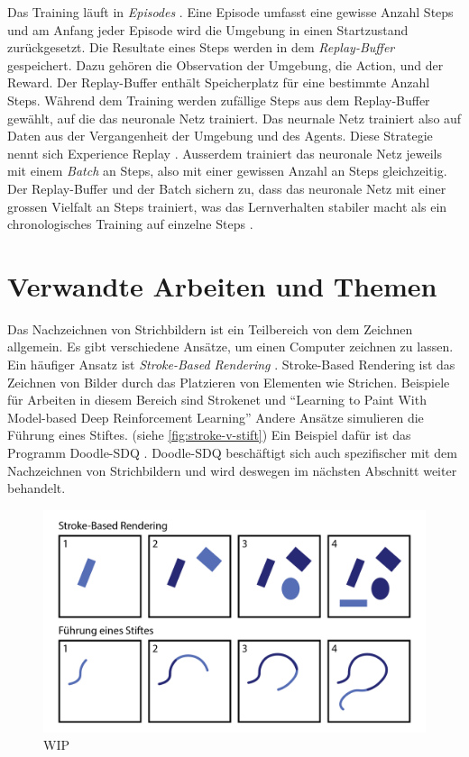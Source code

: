 Das Training läuft in \emph{Episodes} \cite[S. 14]{sutton_reinforcement_2014}.
Eine Episode umfasst eine gewisse Anzahl Steps und am Anfang jeder Episode wird
die Umgebung in einen Startzustand zurückgesetzt. Die Resultate eines Steps
werden in dem \emph{Replay-Buffer} gespeichert. Dazu gehören die Observation der
Umgebung, die Action, und der Reward. Der Replay-Buffer enthält Speicherplatz
für eine bestimmte Anzahl Steps. Während dem Training werden zufällige Steps aus
dem Replay-Buffer gewählt, auf die das neuronale Netz trainiert. Das neurnale
Netz trainiert also auf Daten aus der Vergangenheit der Umgebung und des Agents.
Diese Strategie nennt sich Experience Replay \cite[S. 5]{mnih_playing_2013}.
Ausserdem trainiert das neuronale Netz jeweils mit einem \emph{Batch} an Steps,
also mit einer gewissen Anzahl an Steps gleichzeitig. Der Replay-Buffer und der
Batch sichern zu, dass das neuronale Netz mit einer grossen Vielfalt an Steps
trainiert, was das Lernverhalten stabiler macht als ein chronologisches Training
auf einzelne Steps \cite{phd_how_2021}.


\section{Verwandte Arbeiten und Themen}\label{chap:t_ver} Das Nachzeichnen von
Strichbildern ist ein Teilbereich von dem Zeichnen allgemein. Es gibt
verschiedene Ansätze, um einen Computer zeichnen zu lassen. Ein häufiger Ansatz
ist \emph{Stroke-Based Rendering} \cite{hertzmann_stroke_2002}. Stroke-Based %
Rendering ist das Zeichnen von Bilder durch das Platzieren von Elementen wie
Strichen. Beispiele für Arbeiten in diesem Bereich sind Strokenet
\cite{zheng2018strokenet} und ``Learning to Paint With Model-based Deep
Reinforcement Learning'' \cite{huang_learning_2019} Andere Ansätze simulieren
die Führung eines Stiftes. (siehe \autoref{fig:stroke-v-stift}) Ein Beispiel
dafür ist das Programm Doodle-SDQ \cite{zhou_learning_2018}. Doodle-SDQ
beschäftigt sich auch spezifischer mit dem Nachzeichnen von Strichbildern und
wird deswegen im nächsten Abschnitt weiter behandelt.

\begin{figure}[!ht]
    \centering
    \includegraphics[width=\textwidth]{images/theorie/stroke-v-stift.png}
    \caption{WIP}
    \label{fig:stroke-v-stift}
\end{figure}

